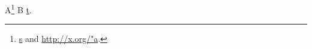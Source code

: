 \documentclass{article}
\begin{document}
A\footnote{\href{http://x.org/"o}{s} and \url{http://x.org/"a}.}
B \href{http://x.org/"u}{t}.
\end{document}
